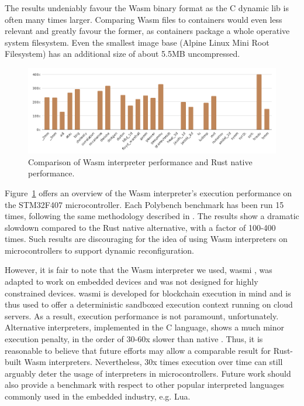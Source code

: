 The results undeniably favour the Wasm binary format as the C dynamic lib is often many times larger. Comparing Wasm files to containers would even less relevant and greatly favour the former, as containers package a whole operative system filesystem. Even the smallest image base (Alpine Linux Mini Root Filesystem) has an additional size of about 5.5MB uncompressed.

\begin{figure}[ht]
\centering
\includegraphics[width=\columnwidth]{figures/b-wasmi-4}
\caption{Comparison of Wasm interpreter performance and Rust native performance.} \label{fig:b-wasmi-4}
\end{figure}

Figure~\ref{fig:b-wasmi-4} offers an overview of the Wasm interpreter's execution performance on the STM32F407 microcontroller. Each Polybench benchmark has been run 15 times, following the same methodology described in \cite{wasm3-performance}. The results show a dramatic slowdown compared to the Rust native alternative, with a factor of 100-400 times. Such results are discouraging for the idea of using Wasm interpreters on microcontrollers to support dynamic reconfiguration.

However, it is fair to note that the Wasm interpreter we used, wasmi \cite{wasmi}, was adapted to work on embedded devices and was not designed for highly constrained devices. wasmi is developed for blockchain execution in mind and is thus used to offer a deterministic sandboxed execution context running on cloud servers. As a result, execution performance is not paramount, unfortunately. Alternative interpreters, implemented in the C language, shows a much minor execution penalty, in the order of 30-60x slower than native \cite{peach2020ewasm}. Thus, it is reasonable to believe that future efforts may allow a comparable result for Rust-built Wasm interpreters. Nevertheless, 30x times execution over time can still arguably deter the usage of interpreters in microcontrollers. Future work should also provide a benchmark with respect to other popular interpreted languages commonly used in the embedded industry, e.g. Lua.


